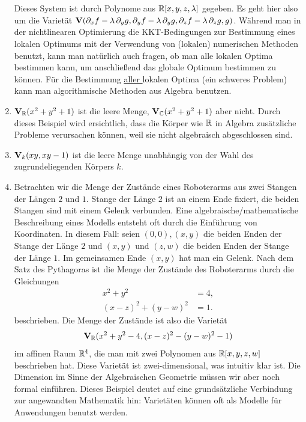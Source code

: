 \documentclass[11pt]{article}
\numberwithin{equation}{section}
\begin{document}
\begin{beispiele}{ \ }
\begin{enumerate}
\begin{align*}
	\end{align*} 
Dieses System ist durch Polynome aus $\mathbb{R}[x,y,z,\lambda]$ gegeben. Es geht hier also um die Varietät 
$\mathbf{V}( \partial_x f - \lambda \, \partial_y g , \partial_y f - \lambda \, \partial_y g  , \partial_z f - \lambda \,  \partial_z g, g )$. Während man in der nichtlinearen Optimierung die KKT-Bedingungen zur Bestimmung eines lokalen Optimums mit der Verwendung von (lokalen) numerischen Methoden benutzt, kann man natürlich auch fragen, ob man alle lokalen Optima bestimmen kann, um anschließend das globale Optimum bestimmen zu können. Für die Bestimmung \underline{aller }lokalen Optima (ein  schweres Problem) kann man algorithmische Methoden aus Algebra benutzen. 
	\item $\mathbf{V}_{\mathbb{R}}(x^2 + y^2 + 1)$ ist die leere Menge, $\mathbf{V}_{\mathbb{C}}(x^2 + y^2 + 1)$ aber nicht. Durch dieses Beispiel wird ersichtlich, dass die Körper wie $\mathbb{R}$ in Algebra zusätzliche Probleme verursachen können, weil sie nicht algebraisch abgeschlossen sind. 
	\item $\mathbf{V}_k(xy,xy-1)$ ist die leere Menge unabhängig von der Wahl des zugrundeliegenden Körpers $k$.
	\item \label{rob:arm}  Betrachten wir die Menge der Zustände eines Roboterarms aus zwei Stangen der Längen $2$ und $1$. Stange der Länge $2$ ist an einem Ende fixiert, die beiden Stangen sind mit einem Gelenk verbunden. Eine algebraische/mathematische Beschreibung eines Modells entsteht oft durch die Einführung von Koordinaten. In diesem Fall:  seien $(0,0), (x,y)$ die beiden Enden der Stange der Länge $2$ und $(x,y)$ und $(z,w)$ die beiden Enden der Stange der Länge $1$. Im gemeinsamen Ende $(x,y)$ hat man ein Gelenk. Nach dem Satz des Pythagoras ist die Menge der Zustände des Roboterarms durch die Gleichungen 
	\begin{align*}
			x^2 + y^2 & = 4,
			\\ (x-z)^2 + (y-w)^2 & = 1.
	\end{align*}
beschrieben. Die Menge der Zustände ist also die Varietät 
\[
	\mathbf{V}_{\mathbb{R}}(x^2 + y^2 - 4, (x-z)^2 - (y-w)^2 - 1)
\]
im affinen Raum $\mathbb{R}^4$, die man mit zwei Polynomen aus $\mathbb{R}[x,y,z,w]$ beschrieben hat. Diese Varietät ist zwei-dimensional, was intuitiv klar ist. Die Dimension im Sinne der Algebraischen Geometrie müssen wir aber noch formal einführen. Dieses Beispiel deutet  auf eine grundsätzliche Verbindung zur angewandten Mathematik hin: Varietäten können oft als Modelle für Anwendungen benutzt werden. 
\end{enumerate} 
\end{beispiele} 
\end{document}
